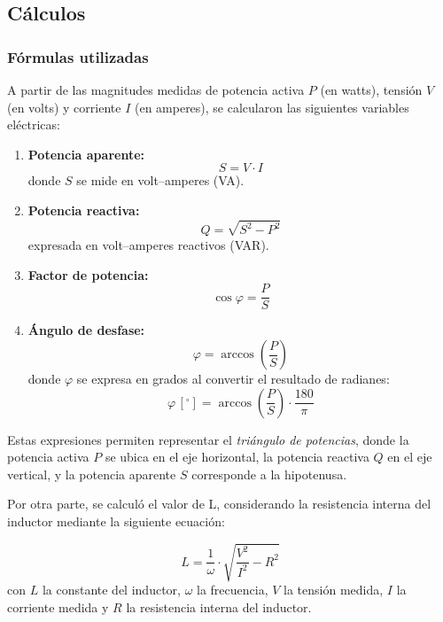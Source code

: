 \documentclass{article}
\begin{document}
    \subsection{Cálculos}

    \subsubsection*{Fórmulas utilizadas}

A partir de las magnitudes medidas de potencia activa $P$ (en watts), 
tensión $V$ (en volts) y corriente $I$ (en amperes), se calcularon las 
siguientes variables eléctricas:

\begin{enumerate}
    \item \textbf{Potencia aparente:}
    \[
        S = V \cdot I
    \]
    donde $S$ se mide en volt–amperes (VA).

    \item \textbf{Potencia reactiva:}
    \[
        Q = \sqrt{S^{2} - P^{2}}
    \]
    expresada en volt–amperes reactivos (VAR).

    \item \textbf{Factor de potencia:}
    \[
        \cos \varphi = \frac{P}{S}
    \]

    \item \textbf{Ángulo de desfase:}
    \[
        \varphi = \arccos\left( \frac{P}{S} \right)
    \]
    donde $\varphi$ se expresa en grados al convertir el resultado de 
    radianes:
    \[
        \varphi \,[^\circ] = \arccos\left( \frac{P}{S} \right) \cdot 
        \frac{180}{\pi}
    \]
\end{enumerate}

        Estas expresiones permiten representar el \textit{triángulo de potencias}, 
        donde la potencia activa $P$ se ubica en el eje horizontal, la potencia 
        reactiva $Q$ en el eje vertical, y la potencia aparente $S$ corresponde a 
        la hipotenusa.\par

	Por otra parte, se calculó el valor de L, considerando la resistencia interna del inductor mediante la siguiente ecuación:

    \begin{equation*}
        L = \frac{1}{\omega} \cdot \sqrt{\frac{V^2}{I^2}-R^2}
    \end{equation*}
    con $L$ la constante del inductor, $\omega$ la frecuencia, $V$ la tensión medida, $I$ la corriente medida y $R$ la resistencia interna del inductor. \par
	
\end{document}
